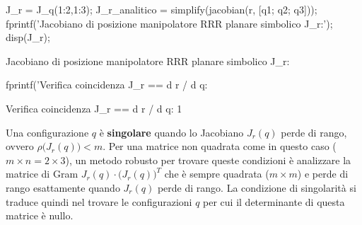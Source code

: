 \documentclass[11pt, a4paper]{article}
\begin{document}
\newpage
\begin{matlabcode}
J_r = J_q(1:2,1:3);
J_r_analitico = simplify(jacobian(r, [q1; q2; q3]));
fprintf('Jacobiano di posizione manipolatore RRR planare simbolico J_r:');
disp(J_r);
\end{matlabcode}
\begin{matlaboutput}
Jacobiano di posizione manipolatore RRR planare simbolico J_r:
\end{matlaboutput}
\begin{matlabsymbolicoutput}
\end{matlabsymbolicoutput}
\begin{matlabcode}[basicstyle=\ttfamily\scriptsize\color{black}, xrightmargin=-0.25cm]
fprintf('Verifica coincidenza J_r == d r / d q: %
\end{matlabcode}
\begin{matlaboutput}
Verifica coincidenza J_r == d r / d q: 1
\end{matlaboutput}

\begin{par}
\begin{flushleft}
Una configurazione $q$ è \textbf{singolare} quando lo Jacobiano $J_r (q)$ perde di rango, ovvero $\rho \bigl(J_r (q)\bigr)<m$. Per una matrice non quadrata come in questo caso ($m\times n=2\times 3$), un metodo robusto per trovare queste condizioni è analizzare la matrice di Gram $J_r (q)\cdot {\bigl(J_r (q)\bigr)}^T$ che è sempre quadrata ($m\times m$) e perde di rango esattamente quando $J_r (q)$ perde di rango. La condizione di singolarità si traduce quindi nel trovare le configurazioni $q$ per cui il determinante di questa matrice è nullo.
\end{flushleft}
\end{par}
\end{document}
